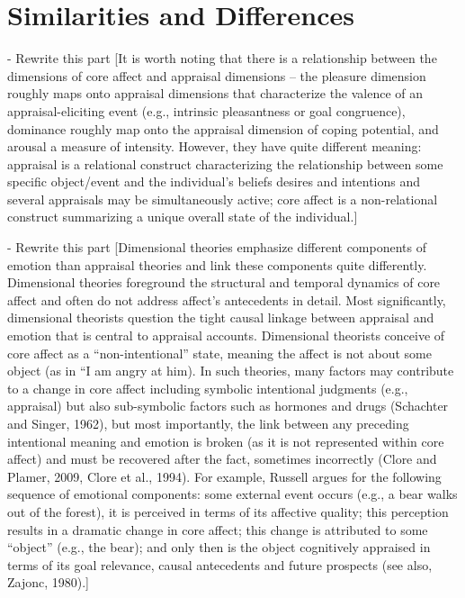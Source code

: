 \documentclass[11pt]{article}
\begin{document}
\section{Similarities and Differences}

- Rewrite this part [It is worth noting that there is a relationship between the
dimensions of core affect and appraisal dimensions – the pleasure dimension
roughly maps onto appraisal dimensions that characterize the valence of an
appraisal-eliciting event (e.g., intrinsic pleasantness or goal congruence),
dominance roughly map onto the appraisal dimension of coping potential, and
arousal a measure of intensity. However, they have quite different meaning:
appraisal is a relational construct characterizing the relationship between some
specific object/event and the individual’s beliefs desires and intentions and
several appraisals may be simultaneously active; core affect is a non-relational
construct summarizing a unique overall state of the individual.]

- Rewrite this part [Dimensional theories emphasize different components of
emotion than appraisal theories and link these components quite differently.
Dimensional theories foreground the structural and temporal dynamics of core
affect and often do not address affect’s antecedents in detail. Most
significantly, dimensional theorists question the tight causal linkage between
appraisal and emotion that is central to appraisal accounts. Dimensional
theorists conceive of core affect as a “non-intentional” state, meaning the
affect is not about some object (as in “I am angry at him). In such theories,
many factors may contribute to a change in core affect including symbolic
intentional judgments (e.g., appraisal) but also sub-symbolic factors such as
hormones and drugs (Schachter and Singer, 1962), but most importantly, the link
between any preceding intentional meaning and emotion is broken (as it is not
represented within core affect) and must be recovered after the fact, sometimes
incorrectly (Clore and Plamer, 2009, Clore et al., 1994). For example, Russell
argues for the following sequence of emotional components: some external event
occurs (e.g., a bear walks out of the forest), it is perceived in terms of its
affective quality; this perception results in a dramatic change in core affect;
this change is attributed to some “object” (e.g., the bear); and only then is
the object cognitively appraised in terms of its goal relevance, causal
antecedents and future prospects (see also, Zajonc, 1980).]
\end{document}
